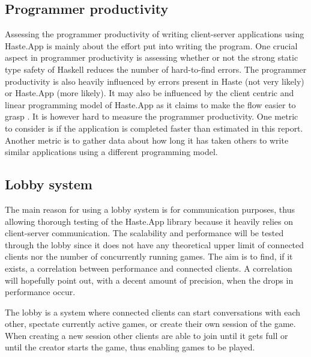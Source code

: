\documentclass[a4paper]{article}
\begin{document}
\subsection{Programmer productivity}
Assessing the programmer productivity of writing client-server applications using Haste.App
is mainly about the effort put into writing the program. One crucial aspect in programmer productivity is assessing whether or not the strong static type safety of Haskell reduces the number of hard-to-find errors. The programmer productivity is also heavily influenced by errors present in Haste (not very likely) or Haste.App (more likely). It may also be influenced by the client centric and linear programming model of Haste.App as it claims to make the flow easier to grasp \cite{ekblad2015seamless}. It is however hard to measure the programmer productivity. One metric to consider is if the application is completed faster than estimated in this report. Another metric is to gather data about how long it has taken others to write similar applications using a different programming model.

\subsection{Lobby system}
The main reason for using a lobby system is for communication purposes, thus allowing thorough testing of the Haste.App library because it heavily relies on client-server communication. The scalability and performance will be tested through the lobby since it does not have any theoretical upper limit of connected clients nor the number of concurrently running games. The aim is to find, if it exists, a correlation between performance and connected clients. A correlation will hopefully point out, with a decent amount of precision, when the drops in performance occur.

The lobby is a system where connected clients can start conversations with each other, spectate currently active games, or create their own session of the game. When creating a new session other clients are able to join until it gets full or until the creator starts the game, thus enabling games to be played.
\end{document}
